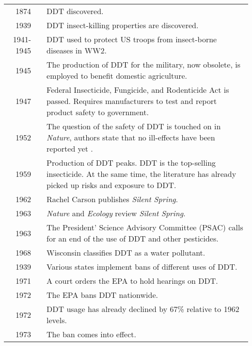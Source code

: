 \documentclass[convert, 12pt]{standalone}
\begin{document}
	\begin{tabularx}{\textwidth}{r @{\hspace{0.5\tabcolsep}} l |@{\hspace{-2.3pt}$\bullet$ \hspace{5pt}} X}
		\toprule

		1874 & & DDT discovered.\\

		1939 & & DDT insect-killing properties are discovered.\\

		1941-1945 & & DDT used to protect US troops from insect-borne diseases in WW2.\\

		1945 & & The production of DDT for the military, now obsolete, is employed to benefit domestic agriculture.\\

		1947 & & Federal Insecticide, Fungicide, and Rodenticide Act is passed. Requires manufacturers to test and report product safety to government.\\

		1952 & & The question of the safety of DDT is touched on in \textit{Nature}, authors state that no ill-effects have been reported yet \citep{Davidson1952}.\\
 
		1959 & & Production of DDT peaks. DDT is the top-selling insecticide. At the same time, the literature has already picked up risks and exposure to DDT.\\

		1962 & & Rachel Carson publishes \textit{Silent Spring}.\\

		1963 & & \textit{Nature} and \textit{Ecology} review \textit{Silent Spring}.\\

		1963 & & The President' Science Advisory Committee (PSAC) calls for an end of the use of DDT and other pesticides.\\

		1968 & & Wisconsin classifies DDT as a water pollutant.\\

		1939 & & Various states implement bans of different uses of DDT.\\

		1971 & & A court orders the EPA to hold hearings on DDT.\\

		1972 & & The EPA bans DDT nationwide.\\

		1972 & & DDT usage has already declined by 67\% relative to 1962 levels.\\

		1973 & & The ban comes into effect.\\


	\end{tabularx}
\end{document}
